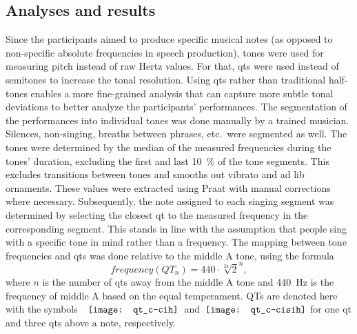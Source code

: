 \subsection{Analyses and results}
\label{subsec:results_music}

Since the participants aimed to produce specific musical notes (as opposed to non-specific absolute frequencies in speech production), tones were used for measuring pitch instead of raw Hertz values.
For that, \acfp{qt} were used instead of semitones to increase the tonal resolution.
Using \acp{qt} rather than traditional half-tones enables a more fine-grained analysis that can capture more subtle tonal deviations to better analyze the participants' performances.
The segmentation of the performances into individual tones was done manually by a trained musician.
Silences, non-singing, breaths between phrases, etc.\ were segmented as well.
The tones were determined by the median of the measured frequencies during the tones' duration, excluding the first and last \SI{10}{\percent} of the tone segments.
This excludes transitions between tones and smooths out vibrato and ad lib ornaments.
These values were extracted using Praat \citep{Boersma2018praat} with manual corrections where necessary.
Subsequently, the note assigned to each singing segment was determined by selecting the closest \ac{qt} to the measured frequency in the corresponding segment.
This stands in line with the assumption that people sing with a specific tone in mind rather than a frequency.
The mapping between tone frequencies and \acp{qt} was done relative to the middle A tone, using the formula \citep[adapted from][]{DeKlerk1979equal}
%
\begin{equation}
	\label{eq:quarter_tones_formula}
	frequency(QT_n) = 440 \cdot \sqrt[24]{2}^n,
\end{equation}
\noindent
%
where $n$ is the number of \acp{qt} away from the middle A tone and \SI{440}{\hertz} is the frequency of middle A based on the equal temperament.
QTs are denoted here with the symbols~\hspace{-0.26cm}~$\vcenter{\hbox{\texttt{[image: qt\_c-cih]}}}$~and~$\vcenter{\hbox{\texttt{[image: qt\_c-cisih]}}}$ for one \ac{qt} and three \acp{qt} above a note, respectively.
